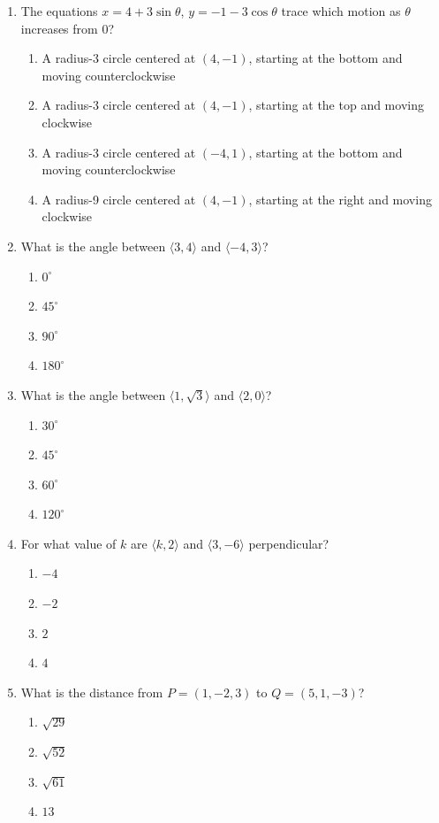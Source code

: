 \documentclass[12pt]{article}
\begin{document}
\begin{enumerate}[leftmargin=*,itemsep=1.1em]
  \item The equations $x=4+3\sin\theta$, $y=-1-3\cos\theta$ trace which motion as $\theta$ increases from $0$?
  \begin{enumerate}[label=\Alph*.,itemsep=0pt]
    \item A radius-3 circle centered at $(4,-1)$, starting at the bottom and moving counterclockwise
    \item A radius-3 circle centered at $(4,-1)$, starting at the top and moving clockwise
    \item A radius-3 circle centered at $(-4,1)$, starting at the bottom and moving counterclockwise
    \item A radius-9 circle centered at $(4,-1)$, starting at the right and moving clockwise
  \end{enumerate}

  \item What is the angle between $\langle3,4\rangle$ and $\langle-4,3\rangle$?
  \begin{enumerate}[label=\Alph*.,itemsep=0pt]
    \item $0^\circ$ \item $45^\circ$ \item $90^\circ$ \item $180^\circ$
  \end{enumerate}

  \item What is the angle between $\langle1,\sqrt3\rangle$ and $\langle2,0\rangle$?
  \begin{enumerate}[label=\Alph*.,itemsep=0pt]
    \item $30^\circ$ \item $45^\circ$ \item $60^\circ$ \item $120^\circ$
  \end{enumerate}

  \item For what value of $k$ are $\langle k,2\rangle$ and $\langle3,-6\rangle$ perpendicular?
  \begin{enumerate}[label=\Alph*.,itemsep=0pt]
    \item $-4$ \item $-2$ \item $2$ \item $4$
  \end{enumerate}

  \item What is the distance from $P=(1,-2,3)$ to $Q=(5,1,-3)$?
  \begin{enumerate}[label=\Alph*.,itemsep=0pt]
    \item $\sqrt{29}$ \item $\sqrt{52}$ \item $\sqrt{61}$ \item $13$
  \end{enumerate}


\end{enumerate}
\end{document}
